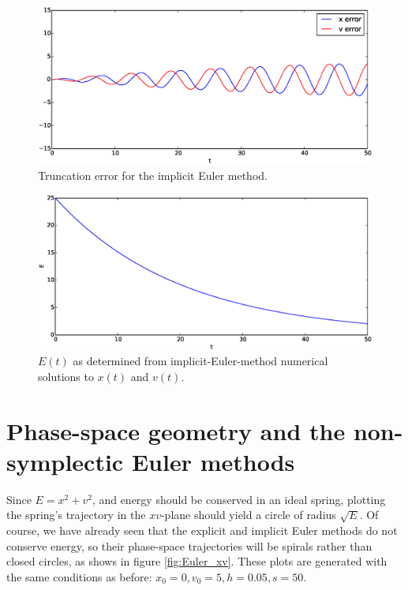 \documentclass{article}
\theoremstyle{definition}
\renewcommand{\>}{\rangle}
\newcommand{\<}{\langle}
\begin{document}
\begin{figure}
\includegraphics[width=\textwidth]{implicit_Euler_error.eps}
\caption{\label{fig:implicit_error}Truncation error for
the implicit Euler method.}
\end{figure}

\begin{figure}
\includegraphics[width=\textwidth]{implicit_Euler_E.eps}
\caption{\label{fig:implicit_E}$E(t)$ as determined from implicit-Euler-method numerical
solutions to $x(t)$ and $v(t)$.}
\end{figure}

\section{Phase-space geometry and the non-symplectic Euler methods}

Since $E=x^2 + v^2$, and energy should be conserved in an ideal spring,
plotting the spring's trajectory in the $xv$-plane should yield a circle of radius
$\sqrt{E}$. Of course, we have already seen that the explicit and implicit Euler
methods do not conserve energy, so their phase-space trajectories will be spirals
rather than closed circles, as shows in figure \ref{fig:Euler_xv}.
These plots are generated with the same conditions as before:
$x_0 = 0, v_0 = 5, h = 0.05, s = 50$.
\end{document}
